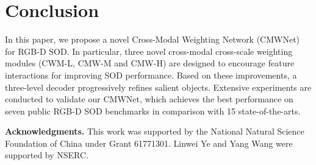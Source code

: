 \documentclass[runningheads]{llncs}
\begin{document}
\section{Conclusion}

In this paper, we propose a novel Cross-Modal Weighting Network (CMWNet) for RGB-D SOD. In particular, three novel cross-modal cross-scale weighting modules (CWM-L, CMW-M and CMW-H) are designed to encourage feature interactions for improving SOD performance. 
Based on these improvements, a three-level decoder progressively refines salient objects.
Extensive experiments are conducted to validate our CMWNet, which achieves the best performance on seven public RGB-D SOD benchmarks in comparison with 15 state-of-the-arts.

\noindent\textbf{Acknowledgments.}
This work was supported by the National Natural Science Foundation of China under Grant 61771301.
Linwei Ye and Yang Wang were supported by NSERC.



\end{document}
